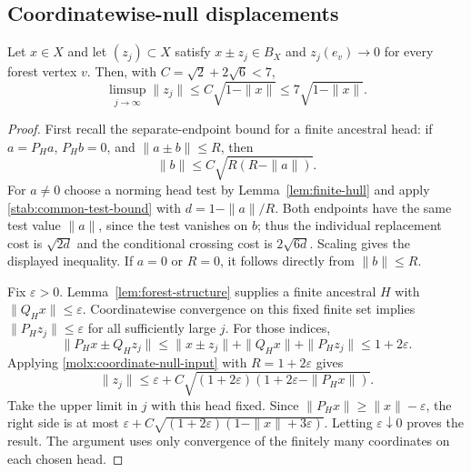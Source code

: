 \subsection{Coordinatewise-null displacements}
\label{molx:coordinate-null-section}

\begin{corollary}\label{molx:coordinate-null}
Let $x\in X$ and let $(z_j)\subset X$ satisfy
$x\pm z_j\in B_X$ and $z_j(e_v)\to0$ for every forest vertex $v$.
Then, with $C=\sqrt2+2\sqrt6<7$,
\begin{equation}\label{molx:coordinate-null-bound}
 \limsup_{j\to\infty}\|z_j\|
 \le C\sqrt{1-\|x\|}\le7\sqrt{1-\|x\|}.
\end{equation}
\end{corollary}

\begin{proof}
First recall the separate-endpoint bound for a finite ancestral head:
if $a=P_Ha$, $P_Hb=0$, and $\|a\pm b\|\le R$, then
\begin{equation}\label{molx:coordinate-null-input}
 \|b\|\le C\sqrt{R(R-\|a\|)}.
\end{equation}
For $a\ne0$ choose a norming head test by
Lemma~\ref{lem:finite-hull} and apply
\eqref{stab:common-test-bound} with
$d=1-\|a\|/R$.  Both endpoints have the same test value
$\|a\|$, since the test vanishes on $b$; thus the individual
replacement cost is $\sqrt{2d}$ and the conditional crossing
cost is $2\sqrt{6d}$.  Scaling gives the displayed inequality.
If $a=0$ or $R=0$, it follows directly from $\|b\|\le R$.

Fix $\varepsilon>0$.  Lemma~\ref{lem:forest-structure} supplies
a finite ancestral $H$ with $\|Q_Hx\|\le\varepsilon$.
Coordinatewise convergence on this fixed finite set implies
$\|P_Hz_j\|\le\varepsilon$ for all sufficiently large $j$.
For those indices,
\[
 \|P_Hx\pm Q_Hz_j\|
 \le\|x\pm z_j\|+\|Q_Hx\|+\|P_Hz_j\|
 \le1+2\varepsilon.
\]
Applying \eqref{molx:coordinate-null-input} with
$R=1+2\varepsilon$ gives
\begin{equation}\label{molx:coordinate-null-approximation}
 \|z_j\|\le\varepsilon+
 C\sqrt{(1+2\varepsilon)(1+2\varepsilon-\|P_Hx\|)}.
\end{equation}
Take the upper limit in $j$ with this head fixed.
Since $\|P_Hx\|\ge\|x\|-\varepsilon$, the right side is at
most
$\varepsilon+C\sqrt{(1+2\varepsilon)(1-\|x\|+3\varepsilon)}$.
Letting $\varepsilon\downarrow0$ proves the result.  The argument
uses only convergence of the finitely many coordinates on each
chosen head.
\end{proof}
